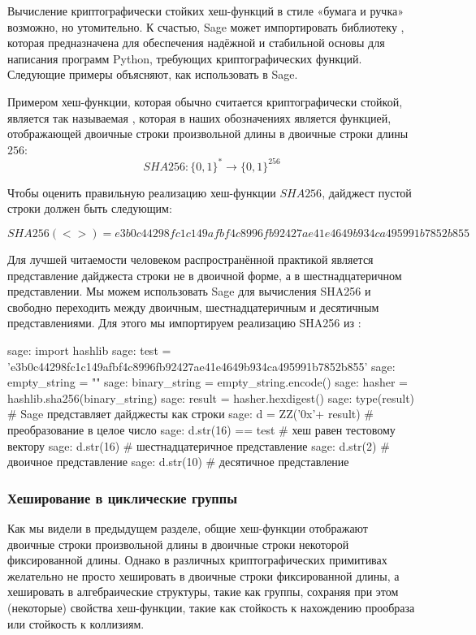 Вычисление криптографически стойких хеш-функций в стиле «бумага и ручка» возможно, но утомительно. К счастью, Sage может импортировать библиотеку , которая предназначена для обеспечения надёжной и стабильной основы для написания программ Python, требующих криптографических функций. Следующие примеры объясняют, как использовать  в Sage.

\begin{example}\label{ex:SHA256}Примером хеш-функции, которая обычно считается криптографически стойкой, является так называемая , которая в наших обозначениях является функцией, отображающей двоичные строки произвольной длины в двоичные строки длины $256$:
\begin{equation}
SHA256: \{0,1\}^* \to \{0,1\}^{256}
\end{equation}

 Чтобы оценить правильную реализацию хеш-функции $SHA256$, дайджест пустой строки должен быть следующим:
 
\begin{equation}
SHA256(<>)= {\scriptstyle e3b0c44298fc1c149afbf4c8996fb92427ae41e4649b934ca495991b7852b855}
\end{equation}

Для лучшей читаемости человеком распространённой практикой является представление дайджеста строки не в двоичной форме, а в шестнадцатеричном представлении. Мы можем использовать Sage для вычисления SHA256 и свободно переходить между двоичным, шестнадцатеричным и десятичным представлениями. Для этого мы импортируем реализацию SHA256 из :
\begin{sagecommandline}
sage: import hashlib
sage: test = 'e3b0c44298fc1c149afbf4c8996fb92427ae41e4649b934ca495991b7852b855' 
sage: empty_string = ""
sage: binary_string = empty_string.encode()
sage: hasher = hashlib.sha256(binary_string) 
sage: result = hasher.hexdigest()
sage: type(result)	# Sage представляет дайджесты как строки
sage: d = ZZ('0x'+ result) # преобразование в целое число
sage: d.str(16) == test	# хеш равен тестовому вектору
sage: d.str(16) # шестнадцатеричное представление
sage: d.str(2) # двоичное представление
sage: d.str(10) # десятичное представление
\end{sagecommandline}
\end{example}

\subsubsection{Хеширование в циклические группы} Как мы видели в предыдущем разделе, общие хеш-функции отображают двоичные строки произвольной длины в двоичные строки некоторой фиксированной длины. Однако в различных криптографических примитивах желательно не просто хешировать в двоичные строки фиксированной длины, а хешировать в алгебраические структуры, такие как группы, сохраняя при этом (некоторые) свойства хеш-функции, такие как стойкость к нахождению прообраза или стойкость к коллизиям.

